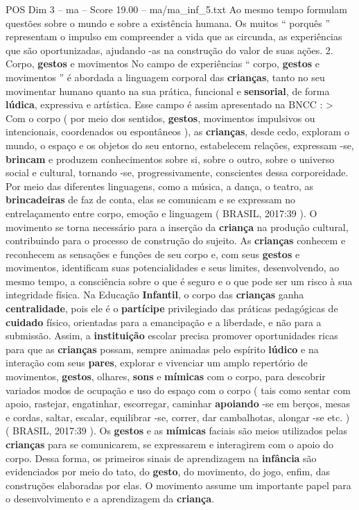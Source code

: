 \begin{textsample}{POS Dim 3 – ma – Score 19.00 – ma/ma\_inf\_5.txt}
Ao mesmo tempo formulam questões sobre o mundo e sobre a existência humana.
Os muitos “ porquês ” representam o impulso em compreender a vida que as circunda, as experiências que são oportunizadas, ajudando -as na construção do valor de suas ações. 2.
Corpo, \textbf{gestos} e movimentos No campo de experiências “ corpo, \textbf{gestos} e movimentos ” é abordada a linguagem corporal das \textbf{crianças}, tanto no seu movimentar humano quanto na sua prática, funcional e \textbf{sensorial}, de forma \textbf{lúdica}, expressiva e artística.
Esse campo é assim apresentado na BNCC : > Com o corpo ( por meio dos sentidos, \textbf{gestos}, movimentos impulsivos ou intencionais, coordenados ou espontâneos ), as \textbf{crianças}, desde cedo, exploram o mundo, o espaço e os objetos do seu entorno, estabelecem relações, expressam -se, \textbf{brincam} e produzem conhecimentos sobre si, sobre o outro, sobre o universo social e cultural, tornando -se, progressivamente, conscientes dessa corporeidade.
Por meio das diferentes linguagens, como a música, a dança, o teatro, as \textbf{brincadeiras} de faz de conta, elas se comunicam e se expressam no entrelaçamento entre corpo, emoção e linguagem ( BRASIL, 2017:39 ).
O movimento se torna necessário para a inserção da \textbf{criança} na produção cultural, contribuindo para o processo de construção do sujeito.
As \textbf{crianças} conhecem e reconhecem as sensações e funções de seu corpo e, com seus \textbf{gestos} e movimentos, identificam suas potencialidades e seus limites, desenvolvendo, ao mesmo tempo, a consciência sobre o que é seguro e o que pode ser um risco à sua integridade física.
Na Educação \textbf{Infantil}, o corpo das \textbf{crianças} ganha \textbf{centralidade}, pois ele é o \textbf{partícipe} privilegiado das práticas pedagógicas de \textbf{cuidado} físico, orientadas para a emancipação e a liberdade, e não para a submissão.
Assim, a \textbf{instituição} escolar precisa promover oportunidades ricas para que as \textbf{crianças} possam, sempre animadas pelo espírito \textbf{lúdico} e na interação com seus \textbf{pares}, explorar e vivenciar um amplo repertório de movimentos, \textbf{gestos}, olhares, \textbf{sons} e \textbf{mímicas} com o corpo, para descobrir variados modos de ocupação e uso do espaço com o corpo ( tais como sentar com apoio, rastejar, engatinhar, escorregar, caminhar \textbf{apoiando} -se em berços, mesas e cordas, saltar, escalar, equilibrar -se, correr, dar cambalhotas, alongar -se etc. ) ( BRASIL, 2017:39 ).
Os \textbf{gestos} e as \textbf{mímicas} faciais são meios utilizados pelas \textbf{crianças} para se comunicarem, se expressarem e interagirem com o apoio do corpo.
Dessa forma, os primeiros sinais de aprendizagem na \textbf{infância} são evidenciados por meio do tato, do \textbf{gesto}, do movimento, do jogo, enfim, das construções elaboradas por elas.
O movimento assume um importante papel para o desenvolvimento e a aprendizagem da \textbf{criança}.

\end{textsample}
